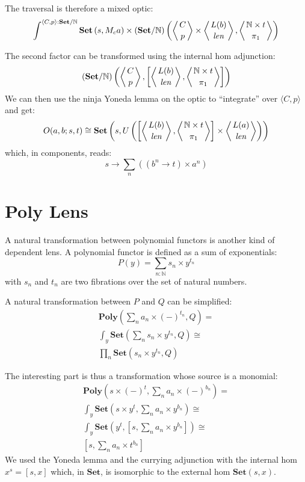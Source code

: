 \documentclass[11pt]{amsart}
\begin{document}
The traversal is therefore a mixed optic:
\[ \int^{\langle C, p \rangle : \mathbf{Set}/\mathbb{N}} \mathbf{Set} 
\left(s,  M_c a \right)  
  \times (\mathbf{Set}/\mathbb{N})\left( \left \langle {C \atop p} \right \rangle 
  \times \left \langle {L(b) \atop \mathit{len}} \right \rangle, \left \langle {\mathbb{N} \times t \atop \pi_1} \right \rangle \right) \]

The second factor can be transformed using the internal hom adjunction:
\[ 
(\mathbf{Set}/\mathbb{N})\left(\left \langle {C \atop p} \right \rangle, \left[ \left \langle {L(b) \atop \mathit{len}} \right \rangle, \left \langle {\mathbb{N} \times t \atop \pi_1} \right \rangle \right] \right) \]
We can then use the ninja Yoneda lemma on the optic to ``integrate'' over $\langle C, p \rangle$ and get:
\[ O(a, b; s, t) \cong \mathbf{Set} \left(  s, U\left( 
  \left[ \left \langle {L(b) \atop \mathit{len}} \right \rangle, \left \langle {\mathbb{N} \times t \atop \pi_1} \right \rangle \right] \times \left \langle {L(a) \atop \mathit{len}} \right \rangle \right) \right) \]
which, in components, reads:
\[ s \to \sum_n \left( (b^n \to t) \times a^n \right) \]

\section{Poly Lens}

A natural transformation between polynomial functors is another kind of dependent lens. A polynomial functor is defined as a sum of exponentials:
\[ P(y) = \sum_{n \colon \mathbb{N}} s_n \times y^{t_n} \]
with $s_n$ and $t_n$ are two fibrations over the set of natural numbers.

A natural transformation between $P$ and $Q$ can be simplified:
\begin{align*}
 \mathbf{Poly}( \sum_n a_n \times (-)^{t_n}, Q) =
\\
 \int_y \mathbf{Set} (\sum_n s_n \times y^{t_n}, Q) \cong
 \\
 \prod_n \mathbf{Set} (s_n \times y^{t_n}, Q)
\end{align*}


The interesting part is thus a transformation whose source is a monomial:
\begin{align*}
 \mathbf{Poly}(s \times (-)^t, \sum_n a_n \times (-)^{b_n}) =
\\
\int_y \mathbf{Set} ( s \times y^t, \sum_n a_n \times y^{b_n}) \cong
\\
\int_y \mathbf{Set} ( y^t, [s, \sum_n a_n \times y^{b_n}]) \cong
\\
[s, \sum_n a_n \times t^{b_n}]
 \end{align*}
 We used the Yoneda lemma and the currying adjunction with the internal hom $x^s = [s, x]$ which, in $\mathbf{Set}$, is isomorphic to the external hom $\mathbf{Set}(s, x)$.
\end{document}
